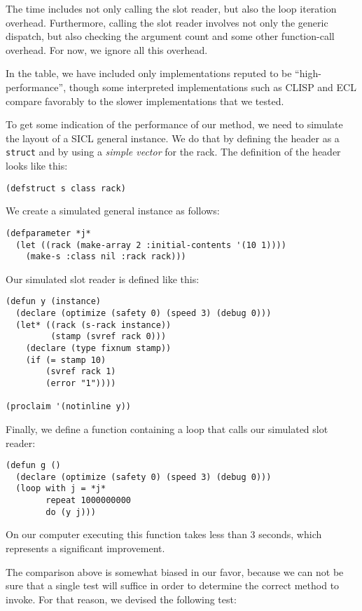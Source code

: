 The time includes not only calling the slot reader, but also the loop
iteration overhead.  Furthermore, calling the slot reader involves not
only the generic dispatch, but also checking the argument count and
some other function-call overhead.  For now, we ignore all this
overhead.

In the table, we have included only implementations reputed to be
``high-performance'', though some interpreted implementations such as
CLISP and ECL compare favorably to the slower implementations that we
tested. 

To get some indication of the performance of our method, we need to
simulate the layout of a SICL general instance.  We do that by
defining the header as a \cl{} \texttt{struct} and by using a
\emph{simple vector} for the rack.  The definition of the header looks
like this:

\begin{verbatim}
(defstruct s class rack)
\end{verbatim}

We create a simulated general instance as follows:

\begin{verbatim}
(defparameter *j* 
  (let ((rack (make-array 2 :initial-contents '(10 1))))
    (make-s :class nil :rack rack)))
\end{verbatim}

Our simulated slot reader is defined like this:

\begin{verbatim}
(defun y (instance)
  (declare (optimize (safety 0) (speed 3) (debug 0)))
  (let* ((rack (s-rack instance))
         (stamp (svref rack 0)))
    (declare (type fixnum stamp))
    (if (= stamp 10)
        (svref rack 1)
        (error "1"))))

(proclaim '(notinline y))
\end{verbatim}

Finally, we define a function containing a loop that calls our
simulated slot reader:

\begin{verbatim}
(defun g ()
  (declare (optimize (safety 0) (speed 3) (debug 0)))
  (loop with j = *j*
        repeat 1000000000
        do (y j)))
\end{verbatim}

On our computer executing this function takes less than $3$ seconds,
which represents a significant improvement.

The comparison above is somewhat biased in our favor, because we can
not be sure that a single test will suffice in order to determine the
correct method to invoke.  For that reason, we devised the following
test: 

